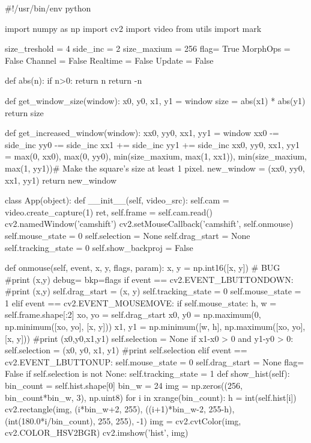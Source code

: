 \documentclass{article}
\begin{document}
\begin{python}
#!/usr/bin/env python

import numpy as np
import cv2
import video
from utils import mark

size_treshold = 4
side_inc = 2
size_maxium = 256
flag= True
MorphOps = False
Channel = False
Realtime = False
Update = False

def abs(n):
    if n>0:
        return n
    return -n

def get_window_size(window):
    x0, y0, x1, y1 = window
    size = abs(x1) * abs(y1)
    return size

def get_increased_window(window):
    xx0, yy0, xx1, yy1 = window
    xx0 -= side_inc
    yy0 -= side_inc
    xx1 += side_inc
    yy1 += side_inc
    xx0, yy0, xx1, yy1 = max(0, xx0), max(0, yy0), min(size_maxium, max(1, xx1)), min(size_maxium, max(1, yy1))# Make the square's size at least 1 pixel.
    new_window = (xx0, yy0, xx1, yy1)
    return new_window

class App(object):
    def __init__(self, video_src):
        self.cam = video.create_capture(1)
        ret, self.frame = self.cam.read()
        cv2.namedWindow('camshift')
        cv2.setMouseCallback('camshift', self.onmouse)
        self.mouse_state = 0
        self.selection = None
        self.drag_start = None
        self.tracking_state = 0
        self.show_backproj = False

    def onmouse(self, event, x, y, flags, param):
        x, y = np.int16([x, y]) # BUG
        #print (x,y)
        debug={}
        bkp=flags
        if event == cv2.EVENT_LBUTTONDOWN:
            #print (x,y)
            self.drag_start = (x, y)
            self.tracking_state = 0
            self.mouse_state = 1
        elif event == cv2.EVENT_MOUSEMOVE:
            if self.mouse_state:
                h, w = self.frame.shape[:2]
                xo, yo = self.drag_start
                x0, y0 = np.maximum(0, np.minimum([xo, yo], [x, y]))
                x1, y1 = np.minimum([w, h], np.maximum([xo, yo], [x, y]))
                #print (x0,y0,x1,y1)
                self.selection = None
                if x1-x0 > 0 and y1-y0 > 0:
                    self.selection = (x0, y0, x1, y1)
                    #print self.selection
        elif event == cv2.EVENT_LBUTTONUP:
            self.mouse_state = 0
            self.drag_start = None
            flag= False
            if self.selection is not None:
                self.tracking_state = 1 
    def show_hist(self):
        bin_count = self.hist.shape[0]
        bin_w = 24
        img = np.zeros((256, bin_count*bin_w, 3), np.uint8)
        for i in xrange(bin_count):
            h = int(self.hist[i])
            cv2.rectangle(img, (i*bin_w+2, 255), ((i+1)*bin_w-2, 255-h), (int(180.0*i/bin_count), 255, 255), -1)
        img = cv2.cvtColor(img, cv2.COLOR_HSV2BGR)
        cv2.imshow('hist', img)


\end{python}
\end{document}
